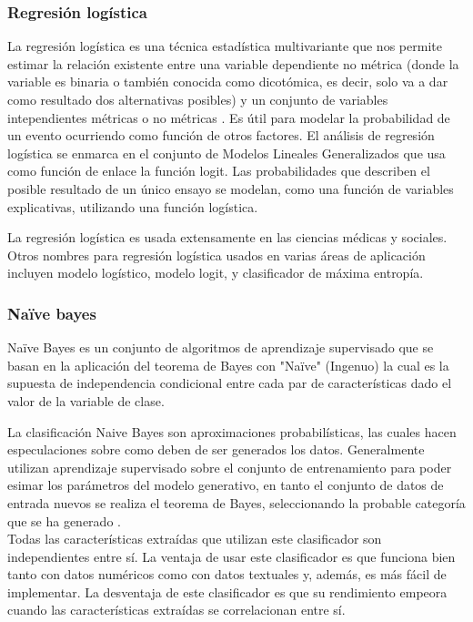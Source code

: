 \subsubsection{Regresión logística}
La regresión logística es una técnica estadística multivariante que nos permite estimar la relación existente entre una variable dependiente 
no métrica (donde la variable es binaria o también conocida como dicotómica, es decir, solo va a dar como resultado dos alternativas posibles) 
y un conjunto de variables intependientes métricas o no métricas \citep{CT6}. Es útil para modelar la probabilidad de un evento ocurriendo como 
función de otros factores. El análisis de regresión logística se enmarca en el conjunto de Modelos Lineales Generalizados que usa como función de 
enlace la función logit. Las probabilidades que describen el posible resultado de un único ensayo se modelan, como una función de variables explicativas, 
utilizando una función logística.

La regresión logística es usada extensamente en las ciencias médicas y sociales. Otros nombres para regresión logística usados en varias áreas de 
aplicación incluyen modelo logístico, modelo logit, y clasificador de máxima entropía.


\subsubsection{Na{\"i}ve bayes}
Na{\"i}ve Bayes es un conjunto de algoritmos de aprendizaje supervisado que se basan en la aplicación del teorema de Bayes con "Na{\"i}ve" 
(Ingenuo) la cual es la supuesta de independencia condicional entre cada par de características dado el valor de la variable de clase. 

La clasificación Naive Bayes son aproximaciones probabilísticas, las cuales hacen especulaciones sobre como deben de ser 
generados los datos. Generalmente utilizan aprendizaje supervisado sobre el conjunto de entrenamiento para poder esimar los parámetros 
del modelo generativo, en tanto el conjunto de datos de entrada nuevos se realiza el teorema de Bayes, seleccionando la probable categoría 
que se ha generado \cite{CT7}.
\\
Todas las características extraídas que utilizan este clasificador son independientes entre sí. La ventaja de usar este clasificador es que 
funciona bien tanto con datos numéricos como con datos textuales y, además, es más fácil de implementar. La desventaja de este clasificador es 
que su rendimiento empeora cuando las características extraídas se correlacionan entre sí.

